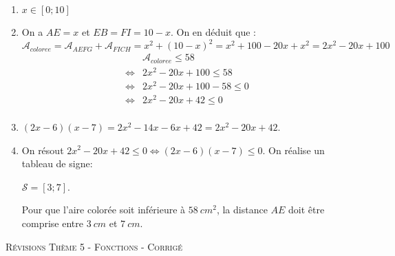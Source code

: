 \documentclass[a4paper]{article}
\begin{document}
    \begin{exercice}{}{}
      \begin{enumerate}
        \item $x\in[0;10]$
        \item On a $AE=x$ et $EB=FI=10-x$.
        On en déduit que :
        $$\mathcal{A}_{coloree}=\mathcal{A}_{AEFG}+\mathcal{A}_{FICH}=x^2+(10-x)^2=x^2+100-20x+x^2=2x^2-20x+100$$
        \begin{align*} 
           &\mathcal{A}_{coloree}\leqslant 58 \\ 
           \iff & 2x^2-20x+100 \leqslant 58\\
           \iff & 2x^2-20x+100-58 \leqslant 0\\
           \iff & 2x^2-20x+42 \leqslant 0\\
          \end{align*}
          \item $(2x-6)(x-7)=2x^2-14x-6x+42=2x^2-20x+42$.
          \item On résout $2x^2-20x+42 \leqslant 0 \iff (2x-6)(x-7) \leqslant 0$.
          On réalise un tableau de signe:
          \begin{center}
          \end{center}
          $\mathcal{S}=[3;7]$.

          Pour que l'aire colorée soit inférieure à $58~cm^2$, la distance $AE$ doit être comprise entre $3~cm$ et $7~cm$.
      \end{enumerate}
    \end{exercice}

    \pagebreak

    \begin{center}
      {\scshape\LARGE Révisions Thème 5 - Fonctions - Corrigé\par}
      \vspace{0.5cm}
    \end{center}
  
    \setcounter{exercice}{0}
\end{document}
